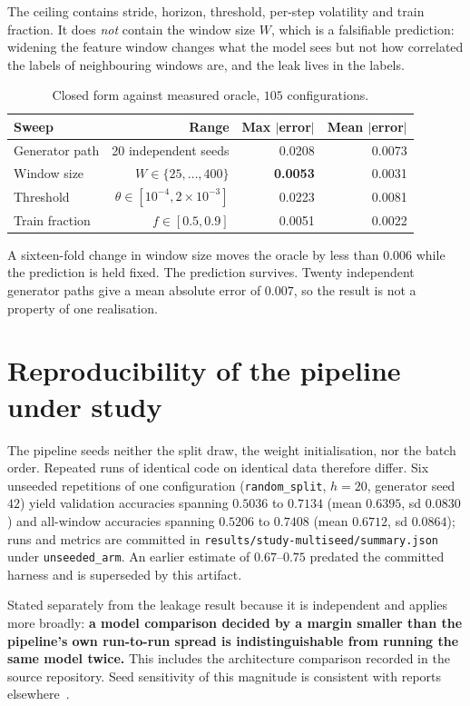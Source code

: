 \documentclass[11pt,a4paper]{article}
\begin{document}
The ceiling contains stride, horizon, threshold, per-step volatility and train
fraction. It does \emph{not} contain the window size $W$, which is a falsifiable
prediction: widening the feature window changes what the model sees but not how
correlated the labels of neighbouring windows are, and the leak lives in the
labels.

\begin{table}[h]
\centering
\begin{tabular}{lrrr}
\toprule
Sweep & Range & Max $|$error$|$ & Mean $|$error$|$ \\
\midrule
Generator path & 20 independent seeds & 0.0208 & 0.0073 \\
Window size & $W \in \{25,\dots,400\}$ & \textbf{0.0053} & 0.0031 \\
Threshold & $\theta \in [10^{-4}, 2\times10^{-3}]$ & 0.0223 & 0.0081 \\
Train fraction & $f \in [0.5, 0.9]$ & 0.0051 & 0.0022 \\
\bottomrule
\end{tabular}
\caption{Closed form against measured oracle, $105$ configurations.}
\end{table}

A sixteen-fold change in window size moves the oracle by less than $0.006$ while
the prediction is held fixed. The prediction survives. Twenty independent
generator paths give a mean absolute error of $0.007$, so the result is not a
property of one realisation.

\section{Reproducibility of the pipeline under study}
\label{sec:repro}

The pipeline seeds neither the split draw, the weight initialisation, nor the
batch order. Repeated runs of identical code on identical data therefore differ.
Six unseeded repetitions of one configuration (\texttt{random\_split}, $h=20$,
generator seed $42$) yield validation accuracies spanning $0.5036$ to $0.7134$
(mean $0.6395$, sd $0.0830$) and all-window accuracies spanning $0.5206$ to
$0.7408$ (mean $0.6712$, sd $0.0864$); runs and metrics are committed in
\texttt{results/study-multiseed/summary.json} under \texttt{unseeded\_arm}. An
earlier estimate of $0.67$--$0.75$ predated the committed harness and is
superseded by this artifact.

Stated separately from the leakage result because it is independent and applies
more broadly: \textbf{a model comparison decided by a margin smaller than the
pipeline's own run-to-run spread is indistinguishable from running the same model
twice.} This
includes the architecture comparison recorded in the source repository. Seed
sensitivity of this magnitude is consistent with reports
elsewhere~\cite{picard2021}.
\end{document}
